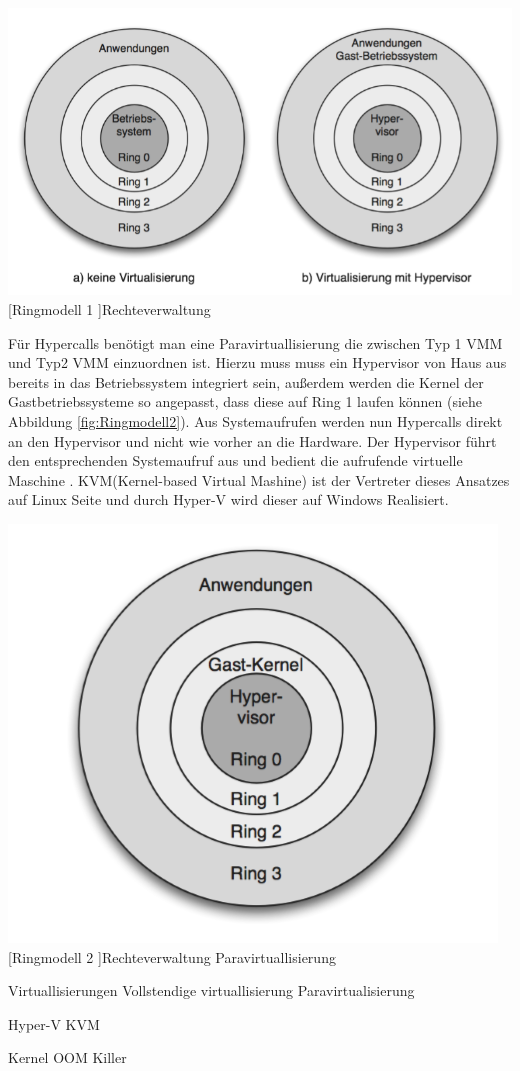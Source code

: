  
 \vspace{1em}
\begin{minipage}{\linewidth}
	\centering
	\includegraphics[width=1\linewidth]{pics/Ringmodell1.PNG}
	[Ringmodell 1 ]{Rechteverwaltung \cite{Meinel2011VirtualisierungMarktubersicht} }
	\label{fig:Ringmodell1}
\end{minipage}
 
 
 
 Für Hypercalls benötigt man eine Paravirtuallisierung die zwischen Typ 1 VMM und Typ2 VMM einzuordnen ist. Hierzu muss muss ein Hypervisor von Haus aus bereits in das Betriebssystem integriert sein, außerdem werden die Kernel der Gastbetriebssysteme so angepasst, dass diese auf Ring 1 laufen können (siehe Abbildung \ref{fig:Ringmodell2}). Aus Systemaufrufen werden nun Hypercalls direkt an den Hypervisor und nicht wie vorher an die Hardware. Der Hypervisor führt den entsprechenden Systemaufruf aus und bedient die aufrufende virtuelle Maschine \cite{Glatz2015Betriebssysteme} \cite{Meinel2011VirtualisierungMarktubersicht}. KVM(Kernel-based Virtual Mashine) ist der Vertreter dieses Ansatzes auf Linux Seite und durch Hyper-V wird dieser auf Windows Realisiert. 



 \vspace{1em}
\begin{minipage}{\linewidth}
	\centering
	\includegraphics[width=0.5\linewidth]{pics/Ringmodell2.PNG}
	[Ringmodell 2 ]{Rechteverwaltung Paravirtuallisierung \cite{Meinel2011VirtualisierungMarktubersicht} }
	\label{fig:Ringmodell2}
\end{minipage}
 





Virtuallisierungen
Vollstendige virtuallisierung 
Paravirtualisierung

Hyper-V
KVM

Kernel
OOM Killer

